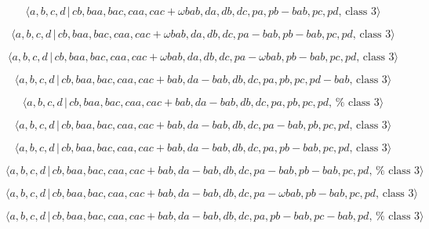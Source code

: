 \documentclass[10pt]{article}
\begin{document}
\begin{equation}
\langle a,b,c,d\,|\,cb,baa,bac,caa,cac+\omega bab,da,db,dc,pa,pb-bab,pc,pd,\,%
\text{class }3\rangle  \tag{7.3787}
\end{equation}

\begin{equation}
\langle a,b,c,d\,|\,cb,baa,bac,caa,cac+\omega
bab,da,db,dc,pa-bab,pb-bab,pc,pd,\,\text{class }3\rangle  \tag{7.3788}
\end{equation}

\begin{equation}
\langle a,b,c,d\,|\,cb,baa,bac,caa,cac+\omega bab,da,db,dc,pa-\omega
bab,pb-bab,pc,pd,\,\text{class }3\rangle  \tag{7.3789}
\end{equation}

\begin{equation}
\langle a,b,c,d\,|\,cb,baa,bac,caa,cac+bab,da-bab,db,dc,pa,pb,pc,pd-bab,\,%
\text{class }3\rangle  \tag{7.3790}
\end{equation}

\begin{equation}
\langle a,b,c,d\,|\,cb,baa,bac,caa,cac+bab,da-bab,db,dc,pa,pb,pc,pd,\,\text{%
class }3\rangle  \tag{7.3791}
\end{equation}

\begin{equation}
\langle a,b,c,d\,|\,cb,baa,bac,caa,cac+bab,da-bab,db,dc,pa-bab,pb,pc,pd,\,%
\text{class }3\rangle  \tag{7.3792}
\end{equation}

\begin{equation}
\langle a,b,c,d\,|\,cb,baa,bac,caa,cac+bab,da-bab,db,dc,pa,pb-bab,pc,pd,\,%
\text{class }3\rangle  \tag{7.3793}
\end{equation}

\begin{equation}
\langle
a,b,c,d\,|\,cb,baa,bac,caa,cac+bab,da-bab,db,dc,pa-bab,pb-bab,pc,pd,\,\text{%
class }3\rangle  \tag{7.3794}
\end{equation}

\begin{equation}
\langle a,b,c,d\,|\,cb,baa,bac,caa,cac+bab,da-bab,db,dc,pa-\omega
bab,pb-bab,pc,pd,\,\text{class }3\rangle  \tag{7.3795}
\end{equation}

\begin{equation}
\langle
a,b,c,d\,|\,cb,baa,bac,caa,cac+bab,da-bab,db,dc,pa,pb-bab,pc-bab,pd,\,\text{%
class }3\rangle  \tag{7.3796}
\end{equation}
\end{document}
